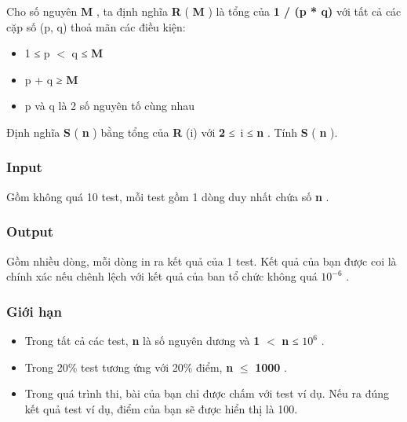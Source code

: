 





   Cho số nguyên   \textbf{    M   }   , ta định nghĩa   \textbf{    R   }   (   \textbf{    M   }   ) là tổng của   \textbf{    1 / (p * q)   }   với tất cả các cặp số (p, q) thoả mãn các điều kiện:  
\begin{itemize}
	\item     1 ≤ p $<$ q ≤    \textbf{     M    }
	\item     p + q ≥    \textbf{     M    }
	\item     p và q là 2 số nguyên tố cùng nhau   
\end{itemize}

   Định nghĩa   \textbf{    S   }   (   \textbf{    n   }   ) bằng tổng của   \textbf{    R   }   (i) với   \textbf{    2   }   ≤ i ≤   \textbf{    n   }   . Tính   \textbf{    S   }   (   \textbf{    n   }   ).  

\subsubsection{   Input  }

   Gồm không quá 10 test, mỗi test gồm 1 dòng duy nhất chứa số   \textbf{    n   }   .  

\subsubsection{   Output  }

   Gồm nhiều dòng, mỗi dòng in ra kết quả của 1 test. Kết quả của bạn được coi là chính xác nếu chênh lệch với kết quả của ban tổ chức không quá   \textbf{    $10^{-6}$}   .  

\subsubsection{   Giới hạn  }
\begin{itemize}
	\item     Trong tất cả các test,    \textbf{     n    }    là số nguyên dương và    \textbf{     1    }    $<$    \textbf{     n    }    ≤    \textbf{     $10^{6}$}    .   
	\item     Trong 20\% test tương ứng với 20\% điểm,    \textbf{     n    }     $\le$     \textbf{     1000    }    .   
	\item     Trong quá trình thi, bài của bạn chỉ được chấm với test ví dụ. Nếu ra đúng kết quả test ví dụ, điểm của bạn sẽ được hiển thị là 100.   
\end{itemize}

